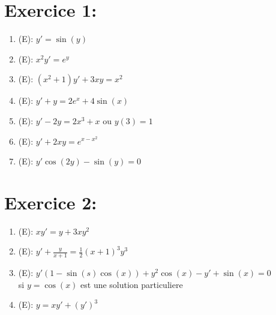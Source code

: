 \documentclass[a4paper,12pt]{article}
\begin{document}
\section*{Exercice 1:}
\begin{enumerate}
	\item (E): $y' = \sin(y)$ \\
	

	\vspace{1.5cm}
	\item (E): $x^2 y' = e^y$ \\
	

	\vspace{1.5cm}
	\item (E): $(x^2 + 1) y' + 3xy = x^2$ \\
	
		
	\vspace{1.5cm}
	\item (E): $y' + y = 2e^x + 4 \sin(x)$ \\
	
	
	\vspace{1.5cm}
	\item (E): $y' - 2y = 2x^3 + x \text{ ou } y(3)=1$ \\
	

	\vspace{1.5cm}
	\item (E): $y' + 2xy = e^{x-x^2}$

	\vspace{1.5cm}
	\item (E): $y' \cos(2y) - \sin(y) = 0$

\end{enumerate}


\section*{Exercice 2:}
\begin{enumerate}
	\item (E): $xy' = y + 3xy^2$ \\
	
	
	\vspace{1.5cm}
	\item (E): $y' + \frac{y}{x+1} = \frac{1}{2} (x+1)^3 y^3$ \\
	
	
	\vspace{1.5cm}
	\item (E): $y' (1 -\sin(s)\cos(x)) + y^2\cos(x) -y' + \sin(x) = 0$ \\ si $y = \cos(x)$ est une solution particuliere
	
	\vspace{1.5cm}
	\item (E): $y = xy' + (y')^3$
\end{enumerate}
\end{document}

